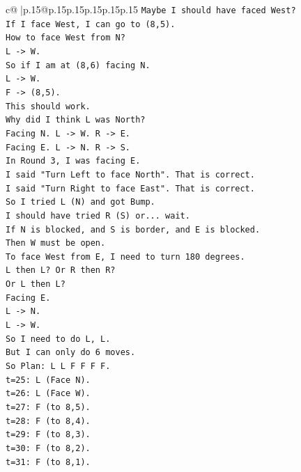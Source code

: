\documentclass{article}
\begin{document}
{\begin{supertabular}{c@{$\;$}|p{.15\linewidth}@{}p{.15\linewidth}p{.15\linewidth}p{.15\linewidth}p{.15\linewidth}p{.15\linewidth}}
{{{\texttt{Maybe I should have faced West?} \\
\texttt{If I face West, I can go to (8,5).} \\
\texttt{How to face West from N?} \\
\texttt{L {-}> W.} \\
\texttt{So if I am at (8,6) facing N.} \\
\texttt{L {-}> W.} \\
\texttt{F {-}> (8,5).} \\
\texttt{This should work.} \\
\texttt{Why did I think L was North?} \\
\texttt{Facing N. L {-}> W. R {-}> E.} \\
\texttt{Facing E. L {-}> N. R {-}> S.} \\
\texttt{In Round 3, I was facing E.} \\
\texttt{I said "Turn Left to face North". That is correct.} \\
\texttt{I said "Turn Right to face East". That is correct.} \\
\texttt{So I tried L (N) and got Bump.} \\
\texttt{I should have tried R (S) or... wait.} \\
\texttt{If N is blocked, and S is border, and E is blocked.} \\
\texttt{Then W must be open.} \\
\texttt{To face West from E, I need to turn 180 degrees.} \\
\texttt{L then L? Or R then R?} \\
\texttt{Or L then L?} \\
\texttt{Facing E.} \\
\texttt{L {-}> N.} \\
\texttt{L {-}> W.} \\
\texttt{So I need to do L, L.} \\
\texttt{But I can only do 6 moves.} \\
\texttt{So Plan: L L F F F F.} \\
\texttt{t=25: L (Face N).} \\
\texttt{t=26: L (Face W).} \\
\texttt{t=27: F (to 8,5).} \\
\texttt{t=28: F (to 8,4).} \\
\texttt{t=29: F (to 8,3).} \\
\texttt{t=30: F (to 8,2).} \\
\texttt{t=31: F (to 8,1).} \\
}}}
\end{supertabular}}
\end{document}
